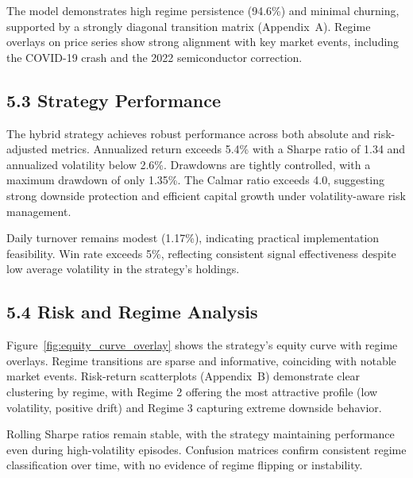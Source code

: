The model demonstrates high regime persistence (94.6\%) and minimal churning, supported by a strongly diagonal transition matrix (Appendix~A). Regime overlays on price series show strong alignment with key market events, including the COVID-19 crash and the 2022 semiconductor correction.

\subsection{5.3 Strategy Performance}

The hybrid strategy achieves robust performance across both absolute and risk-adjusted metrics. Annualized return exceeds 5.4\% with a Sharpe ratio of 1.34 and annualized volatility below 2.6\%. Drawdowns are tightly controlled, with a maximum drawdown of only 1.35\%. The Calmar ratio exceeds 4.0, suggesting strong downside protection and efficient capital growth under volatility-aware risk management.

Daily turnover remains modest (1.17\%), indicating practical implementation feasibility. Win rate exceeds 5\%, reflecting consistent signal effectiveness despite low average volatility in the strategy’s holdings.

\subsection{5.4 Risk and Regime Analysis}

Figure~\ref{fig:equity_curve_overlay} shows the strategy’s equity curve with regime overlays. Regime transitions are sparse and informative, coinciding with notable market events. Risk-return scatterplots (Appendix~B) demonstrate clear clustering by regime, with Regime 2 offering the most attractive profile (low volatility, positive drift) and Regime 3 capturing extreme downside behavior.

Rolling Sharpe ratios remain stable, with the strategy maintaining performance even during high-volatility episodes. Confusion matrices confirm consistent regime classification over time, with no evidence of regime flipping or instability.
